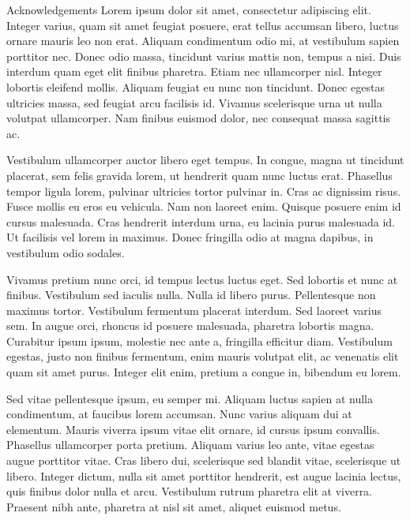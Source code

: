 \begin{coverpage}{Acknowledgements}
Lorem ipsum dolor sit amet, consectetur adipiscing elit. Integer varius, quam sit amet feugiat posuere, erat tellus accumsan libero, luctus ornare mauris leo non erat. Aliquam condimentum odio mi, at vestibulum sapien porttitor nec. Donec odio massa, tincidunt varius mattis non, tempus a nisi. Duis interdum quam eget elit finibus pharetra. Etiam nec ullamcorper nisl. Integer lobortis eleifend mollis. Aliquam feugiat eu nunc non tincidunt. Donec egestas ultricies massa, sed feugiat arcu facilisis id. Vivamus scelerisque urna ut nulla volutpat ullamcorper. Nam finibus euismod dolor, nec consequat massa sagittis ac.

Vestibulum ullamcorper auctor libero eget tempus. In congue, magna ut tincidunt placerat, sem felis gravida lorem, ut hendrerit quam nunc luctus erat. Phasellus tempor ligula lorem, pulvinar ultricies tortor pulvinar in. Cras ac dignissim risus. Fusce mollis eu eros eu vehicula. Nam non laoreet enim. Quisque posuere enim id cursus malesuada. Cras hendrerit interdum urna, eu lacinia purus malesuada id. Ut facilisis vel lorem in maximus. Donec fringilla odio at magna dapibus, in vestibulum odio sodales.

Vivamus pretium nunc orci, id tempus lectus luctus eget. Sed lobortis et nunc at finibus. Vestibulum sed iaculis nulla. Nulla id libero purus. Pellentesque non maximus tortor. Vestibulum fermentum placerat interdum. Sed laoreet varius sem. In augue orci, rhoncus id posuere malesuada, pharetra lobortis magna. Curabitur ipsum ipsum, molestie nec ante a, fringilla efficitur diam. Vestibulum egestas, justo non finibus fermentum, enim mauris volutpat elit, ac venenatis elit quam sit amet purus. Integer elit enim, pretium a congue in, bibendum eu lorem.

Sed vitae pellentesque ipsum, eu semper mi. Aliquam luctus sapien at nulla condimentum, at faucibus lorem accumsan. Nunc varius aliquam dui at elementum. Mauris viverra ipsum vitae elit ornare, id cursus ipsum convallis. Phasellus ullamcorper porta pretium. Aliquam varius leo ante, vitae egestas augue porttitor vitae. Cras libero dui, scelerisque sed blandit vitae, scelerisque ut libero. Integer dictum, nulla sit amet porttitor hendrerit, est augue lacinia lectus, quis finibus dolor nulla et arcu. Vestibulum rutrum pharetra elit at viverra. Praesent nibh ante, pharetra at nisl sit amet, aliquet euismod metus.
\end{coverpage}